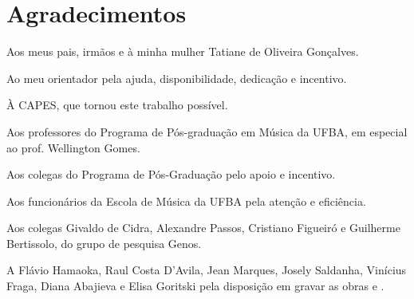 \chapter*{Agradecimentos}
\label{cha:agradecimentos}

Aos meus pais, irmãos e à minha mulher Tatiane de Oliveira Gonçalves.

Ao meu orientador pela ajuda, disponibilidade, dedicação e incentivo.

À CAPES, que tornou este trabalho possível.

Aos professores do Programa de Pós-graduação em Música da UFBA, em
especial ao prof. Wellington Gomes.

Aos colegas do Programa de Pós-Graduação pelo apoio e incentivo.

Aos funcionários da Escola de Música da UFBA pela atenção e
eficiência.

Aos colegas Givaldo de Cidra, Alexandre Passos, Cristiano Figueiró e
Guilherme Bertissolo, do grupo de pesquisa Genos.

A Flávio Hamaoka, Raul Costa D'Avila, Jean Marques, Josely Saldanha,
Vinícius Fraga, Diana Abajieva e Elisa Goritski pela disposição em
gravar as obras  e \obra{}.
